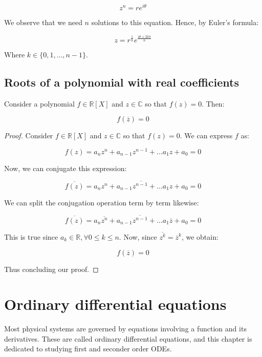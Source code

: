 \documentclass[12pt]{article}
\begin{document}
\[ z^n = re^{i\theta} \]

We observe that we need $n$ solutions to this equation. Hence, by Euler's formula:

\[ z = r^{\frac{1}{n}}e^{\frac{i\theta + 2k\pi}{n}} \]

Where $k \in \{0, 1, \dots, n-1\}$.

\newpage

\subsection{Roots of a polynomial with real coefficients}

\begin{theorem}
    Consider a polynomial $f \in \mathbb{R}[X]$ and $z \in \mathbb{C}$ so that $f(z) = 0$. Then:

    \[ f(\overline{z}) = 0 \]
\end{theorem}

\begin{proof}
    Consider $f \in \mathbb{R}[X]$ and $z \in \mathbb{C}$ so that $f(z) = 0$. We can express $f$ as:

    \[ f(z) = a_nz^n + a_{n-1}z^{n-1} + \dots a_1z + a_0 = 0 \]

    Now, we can conjugate this expression:

    \[ \overline{f(z)} = \overline{a_nz^n + a_{n-1}z^{n-1} + \dots a_1z + a_0} = 0 \]

    We can split the conjugation operation term by term likewise:

    \[ \overline{f(z)} = a_n\overline{z^n} + a_{n-1}\overline{z^{n-1}} + \dots a_1\overline{z} + a_0 = 0 \]

    This is true since $a_k \in \mathbb{R}, \forall 0 \leq k \leq n$. Now, since $\overline{z^k} = \overline{z}^k$, we obtain:

    \[ f(\overline{z}) = 0 \]

    Thus concluding our proof.
\end{proof}

\newpage

\section{Ordinary differential equations}

Most physical systems are governed by equations involving a function and its derivatives. These are called ordinary differential equations, and this chapter is dedicated to studying first and seconder order ODEs.
\end{document}
